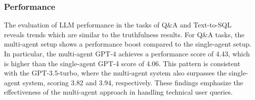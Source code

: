                 
            \subsubsection{Performance}        

                The evaluation of LLM performance \citep{Li2023} in the tasks of Q\&A and Text-to-SQL reveals trends which are similar to the truthfulness results. 
                For Q\&A tasks, the multi-agent setup shows a performance boost compared to the single-agent setup. In particular, the multi-agent GPT-4 achieves a performance score of 4.43, which is higher than the single-agent GPT-4 score of 4.06. This pattern is consistent with the GPT-3.5-turbo, where the multi-agent system also surpasses the single-agent system, scoring 3.82 and 3.94, respectively. These findings emphasize the effectiveness of the multi-agent approach in handling technical user queries.
                        
